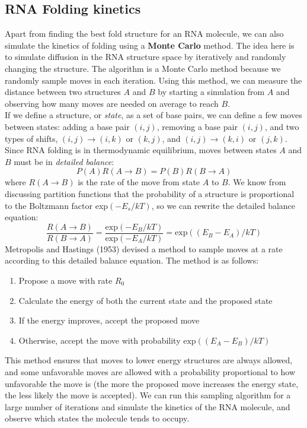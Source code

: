 \documentclass[12pt]{article}
\begin{document}
\subsection{RNA Folding kinetics}
Apart from finding the best fold structure for an RNA molecule, we can also simulate the kinetics of folding using a \textbf{Monte Carlo} method. The idea here is to simulate diffusion in the RNA structure space by iteratively and randomly changing the structure. The algorithm is a Monte Carlo method because we randomly sample moves in each iteration. Using this method, we can measure the distance between two structures $A$ and $B$ by starting a simulation from $A$ and observing how many moves are needed on average to reach $B$.\\[10pt]
If we define a structure, or \textit{state}, as a set of base pairs, we can define a few moves between states: adding a base pair $(i,j)$, removing a base pair $(i,j)$, and two types of shifts, $(i,j)\rightarrow(i,k)\text{ or }(k,j)$, and $(i,j)\rightarrow(k,i)\text{ or }(j,k)$.\\[10pt]
Since RNA folding is in thermodynamic equilibrium, moves between states $A$ and $B$ must be in \textit{detailed balance}:
$$P(A)R(A\rightarrow B) = P(B)R(B\rightarrow A)$$
where $R(A\rightarrow B)$ is the rate of the move from state $A$ to $B$. We know from discussing partition functions that the probability of a structure is proportional to the Boltzmann factor exp$(-E_s/kT)$, so we can rewrite the detailed balance equation:
$$\frac{R(A\rightarrow B)}{R(B\rightarrow A)} = \frac{\text{exp}(-E_B/kT)}{\text{exp}(-E_A/kT)} = \text{exp}((E_B - E_A) / kT)$$
Metropolis and Hastings (1953) devised a method to sample moves at a rate according to this detailed balance equation. The method is as follows:
\begin{enumerate}
    \item Propose a move with rate $R_0$
    \item Calculate the energy of both the current state and the proposed state
    \item If the energy improves, accept the proposed move
    \item Otherwise, accept the move with probability $\text{exp}((E_A - E_B) / kT)$
\end{enumerate}
This method ensures that moves to lower energy structures are always allowed, and some unfavorable moves are allowed with a probability proportional to how unfavorable the move is (the more the proposed move increases the energy state, the less likely the move is accepted). We can run this sampling algorithm for a large number of iterations and simulate the kinetics of the RNA molecule, and observe which states the molecule tends to occupy.
\end{document}
